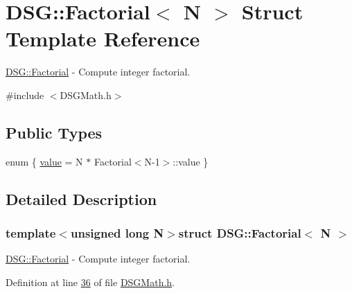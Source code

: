 \hypertarget{struct_d_s_g_1_1_factorial}{\section{D\+S\+G\+:\+:Factorial$<$ N $>$ Struct Template Reference}
\label{struct_d_s_g_1_1_factorial}
}


\hyperlink{struct_d_s_g_1_1_factorial}{D\+S\+G\+::\+Factorial} -\/ Compute integer factorial.  




{\ttfamily \#include $<$D\+S\+G\+Math.\+h$>$}

\subsection*{Public Types}
\begin{DoxyCompactItemize}
\item 
enum \{ \hyperlink{struct_d_s_g_1_1_factorial_a2443a477420ba8fc5494b186a58dcaccaebc078d57d6fc1fbd5953d284c9cde04}{value} = N $\ast$ Factorial$<$N-\/1$>$\+:\+:value
 \}
\end{DoxyCompactItemize}


\subsection{Detailed Description}
\subsubsection*{template$<$unsigned long N$>$struct D\+S\+G\+::\+Factorial$<$ N $>$}

\hyperlink{struct_d_s_g_1_1_factorial}{D\+S\+G\+::\+Factorial} -\/ Compute integer factorial. 

Definition at line \hyperlink{_d_s_g_math_8h_source_l00036}{36} of file \hyperlink{_d_s_g_math_8h_source}{D\+S\+G\+Math.\+h}.



